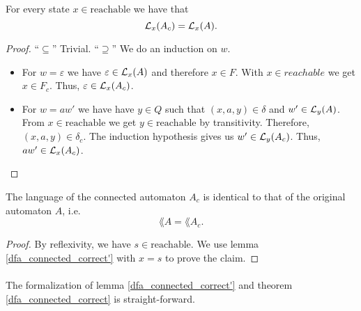     \begin{lemma}
        \label{dfa_connected_correct'}
        For every state $x \in \mathrm{reachable}$ we have that
        \begin{equation*}
            \mathcal{L}_{x}(A_c) = \mathcal{L}_{x}(A).
        \end{equation*}
    \end{lemma}
    \begin{proof}
        ``$\subseteq$'' Trivial.
        ``$\supseteq$''
        We do an induction on $w$.
        \begin{itemize}
            \item
                For $w = \varepsilon$ we have $\varepsilon \in \mathcal{L}_{x}(A)$ and therefore $x \in F$. 
                With $x \in reachable$ we get $x \in F_c$. 
                Thus, $\varepsilon \in \mathcal{L}_{x}(A_c)$.
            \item
                For $w = a w'$ we have have $y \in Q$ such that $(x, a, y) \in \delta$ and $w' \in \mathcal{L}_{y}(A)$.
                From $x \in \mathrm{reachable}$ we get $y \in \mathrm{reachable}$ by transitivity.
                Therefore, $(x,a,y) \in \delta_c$.
                The induction hypothesis gives us $w' \in \mathcal{L}_{y}(A_c)$. 
                Thus, $a w' \in \mathcal{L}_{x}(A_c)$.
        \end{itemize}
    \end{proof}

    \begin{theorem}
        \label{dfa_connected_correct}
        The language of the connected automaton $A_c$ is identical to that of the original automaton $A$, i.e.
        \begin{equation*}
            \lang{A} = \lang{A_c}.        
        \end{equation*}
    \end{theorem}

    \begin{proof}
        By reflexivity, we have $s \in \mathrm{reachable}$. 
        We use lemma \ref{dfa_connected_correct'} with $x = s$ to prove the claim.
    \end{proof}

    \paragraph{}
    The formalization of lemma \ref{dfa_connected_correct'} and theorem \ref{dfa_connected_correct} is straight-forward.
    
